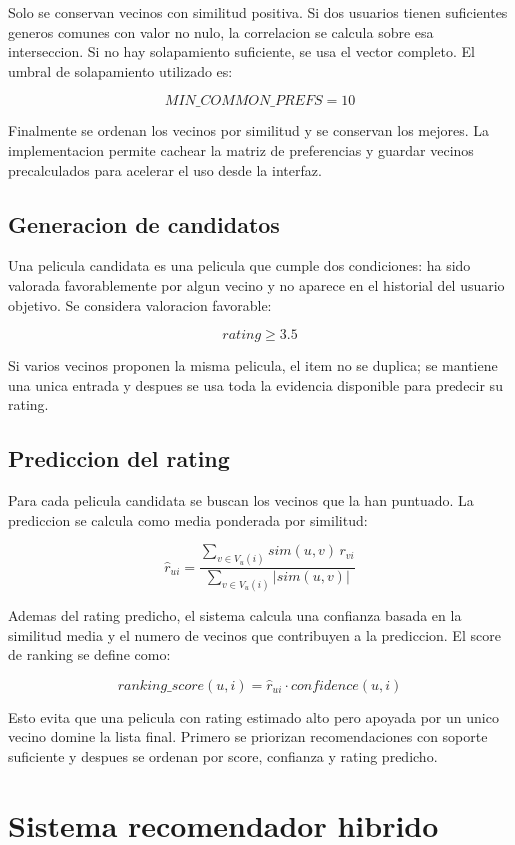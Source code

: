 \documentclass[12pt,a4paper]{article}
\begin{document}
Solo se conservan vecinos con similitud positiva. Si dos usuarios tienen suficientes generos comunes con valor no nulo, la correlacion se calcula sobre esa interseccion. Si no hay solapamiento suficiente, se usa el vector completo. El umbral de solapamiento utilizado es:

\[
MIN\_COMMON\_PREFS = 10
\]

Finalmente se ordenan los vecinos por similitud y se conservan los mejores. La implementacion permite cachear la matriz de preferencias y guardar vecinos precalculados para acelerar el uso desde la interfaz.

\subsection{Generacion de candidatos}

Una pelicula candidata es una pelicula que cumple dos condiciones: ha sido valorada favorablemente por algun vecino y no aparece en el historial del usuario objetivo. Se considera valoracion favorable:

\[
rating \geq 3.5
\]

Si varios vecinos proponen la misma pelicula, el item no se duplica; se mantiene una unica entrada y despues se usa toda la evidencia disponible para predecir su rating.

\subsection{Prediccion del rating}

Para cada pelicula candidata se buscan los vecinos que la han puntuado. La prediccion se calcula como media ponderada por similitud:

\[
\hat{r}_{ui} =
\frac{\sum_{v \in V_u(i)} sim(u,v)\, r_{vi}}
{\sum_{v \in V_u(i)} |sim(u,v)|}
\]

Ademas del rating predicho, el sistema calcula una confianza basada en la similitud media y el numero de vecinos que contribuyen a la prediccion. El score de ranking se define como:

\[
ranking\_score(u,i) = \hat{r}_{ui} \cdot confidence(u,i)
\]

Esto evita que una pelicula con rating estimado alto pero apoyada por un unico vecino domine la lista final. Primero se priorizan recomendaciones con soporte suficiente y despues se ordenan por score, confianza y rating predicho.

\section{Sistema recomendador hibrido}
\end{document}
